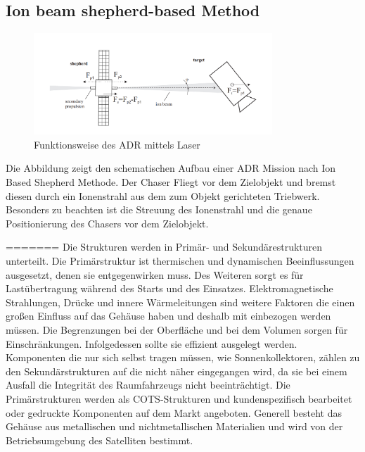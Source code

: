 \subsection{Ion beam shepherd-based Method}

	\begin{figure}[h]
			\centering
					\includegraphics[width=0.80\textwidth]{./graphics/ADR/Shepherd.PNG}
				\caption{Funktionsweise des ADR mittels Laser}
				\label{fig:Laser}
			\end{figure}

Die Abbildung  zeigt den schematischen Aufbau einer ADR Mission nach Ion Based Shepherd Methode. Der Chaser Fliegt vor dem Zielobjekt und bremst diesen durch ein Ionenstrahl aus dem zum Objekt gerichteten Triebwerk. Besonders zu beachten ist die Streuung des Ionenstrahl und die genaue Positionierung des Chasers vor dem Zielobjekt.

=======
		Die Strukturen werden in Primär- und Sekundärestrukturen unterteilt. Die Primärstruktur ist thermischen und dynamischen Beeinflussungen ausgesetzt, denen sie entgegenwirken muss. Des Weiteren sorgt es für Lastübertragung während des Starts und des Einsatzes. Elektromagnetische Strahlungen, Drücke und innere Wärmeleitungen sind weitere Faktoren die einen großen Einfluss auf das Gehäuse haben und deshalb mit einbezogen werden müssen. Die Begrenzungen bei der Oberfläche und bei dem Volumen sorgen für Einschränkungen. Infolgedessen sollte sie effizient ausgelegt werden. Komponenten die nur sich selbst tragen müssen, wie Sonnenkollektoren, zählen zu den Sekundärstrukturen auf die nicht näher eingegangen wird, da sie bei einem Ausfall die Integrität des Raumfahrzeugs nicht beeinträchtigt. Die Primärstrukturen werden als COTS-Strukturen und kundenspezifisch bearbeitet oder gedruckte Komponenten auf dem Markt angeboten. Generell besteht das Gehäuse aus metallischen und nichtmetallischen Materialien und wird von der Betriebsumgebung des Satelliten bestimmt.  \cite[S. 96 - 108]{NASA.Sota.2018}
				
